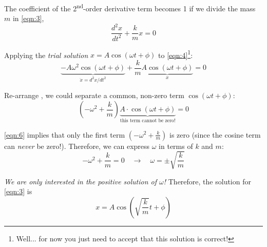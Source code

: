 \documentclass[12pt,a4paper]{article}
\begin{document}
\begin{tcolorbox}[breakable, title=Solution Procedure]
The coefficient of the 2\textsuperscript{nd}-order derivative term becomes 1 if we divide the mass $m$ in \autoref{eqn:3}, 
\begin{equation} \label{eqn:4}
    \frac{d^{2}x}{dt^{2}}+\frac{k}{m}x=0  
\end{equation}

Applying the \textit{trial solution} $\displaystyle x = A\cos (\omega t+ \phi)$ to \autoref{eqn:4}\footnote{Well... for now you just need to accept that this solution is correct!}:
\begin{equation} \label{eqn:5}
    \underbrace{-A\omega^{2}\cos(\omega t+ \phi)}_{\ddot{x} = {d^{2}x}/{dt^{2}}} + \frac{k}{m} \underbrace{A\cos(\omega t+\phi)}_{x}=0
\end{equation}

Re-arrange \label{eqn:5}, we could separate a common, non-zero term $\cos(\omega t+\phi)$: 
\begin{equation} \label{eqn:6}
(-\omega^{2}+ \frac{k}{m}) \underbrace{A \cdot \cos(\omega t+\phi)}_{\text{this term cannot be zero!}} = 0
\end{equation}

\autoref{eqn:6} implies that only the first term $\displaystyle (-\omega^{2}+ \frac{k}{m})$ is zero (since the cosine term can \textit{never} be zero!). Therefore, we can express $\omega$ in terms of $k$ and $m$:
\begin{equation} \label{eqn:7}
-\omega^{2}+ \frac{k}{m}=0 \quad \to \quad 
\boxed{\omega = \pm \sqrt{\frac{k}{m}}}
\end{equation}

\textit{We are only interested in the positive solution of $\omega$!} Therefore, the solution for \autoref{eqn:3} is
\begin{equation} \label{eqn:8}
    \boxed{x = A\cos (\sqrt{\frac{k}{m}}t+\phi)}
\end{equation}
\end{tcolorbox}
\end{document}
